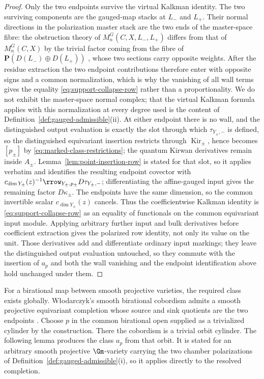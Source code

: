 \begin{proof}
Only the two endpoints survive the virtual Kalkman
identity.  The two surviving components are the gauged-map stacks at \(L_-\)
and \(L_+\).  Their normal directions in the polarization master stack are the
two ends of the master-space fibre: the obstruction theory of
\(M^G_n(C,X,L_-,L_+)\) differs from that of \(M^G_n(C,X)\) by the trivial
factor coming from the fibre of \(\mathbf P(D(L_-)\oplus D(L_+))\)
\cite[Lemma~3.21 and its proof]{GonzalezWoodward}, whose two sections carry
opposite weights.  After the residue extraction the two endpoint
contributions therefore enter with opposite signs and a common normalization,
which is why the vanishing of all wall terms gives the equality
\eqref{eq:support-collapse-row} rather than a proportionality.  We do not
exhibit the master-space normal complex; that the virtual Kalkman formula
applies with this normalization at every degree used is the content of
Definition~\ref{def:gauged-admissible}\textup{(ii)}.  At either endpoint there
is no wall, and the
distinguished output evaluation is exactly the slot through which
\(\tau_{Y_\pm,-}\) is defined, so the distinguished equivariant
insertion restricts through \(\operatorname{Kir}_\pm\), hence becomes
\([p_\pm]\) by \eqref{eq:marked-class-restrictions}; the quantum Kirwan
derivatives remain inside
\(A_\pm\).  Lemma~\ref{lem:point-insertion-row} is stated for that slot, so it
applies verbatim and identifies the resulting
endpoint covector with
\(c_{\dim Y_\pm}(z)^{-1}\rrow_{Y_\pm,p_\pm}D\tau_{Y_\pm,-}\);
differentiating the affine-gauged input gives the remaining factor
\(D\kappa_\pm\).  The
endpoints have the same dimension, so the common invertible scalar
\(c_{\dim Y_\pm}(z)\) cancels.  Thus the
coefficientwise Kalkman identity is \eqref{eq:support-collapse-row} as an
equality of functionals on
the common equivariant input module.  Applying arbitrary further input and
bulk derivatives before coefficient extraction gives the polarized row
identity, not only its value on the unit.  Those derivatives add and
differentiate ordinary input markings; they leave the distinguished output
evaluation untouched, so they commute with the insertion of \(a_p\) and both
the wall vanishing and the endpoint identification above hold unchanged under
them.
\end{proof}

For a birational map between smooth projective varieties, the required class
exists globally.  W{\l}odarczyk's smooth birational cobordism admits a smooth
projective equivariant completion whose source and sink quotients are the two
endpoints \cite[Proposition~2(B')]{Wlodarczyk}.  Choose \(p\) in the common
birational open supplied as a trivialized cylinder by the construction.
There the cobordism is a trivial orbit cylinder.  The following lemma
produces the class \(a_p\) from that orbit.  It is stated for an arbitrary
smooth projective \(\Gm\)-variety carrying the two chamber polarizations of
Definition~\ref{def:gauged-admissible}\textup{(i)}, so it applies directly
to the resolved completion.

